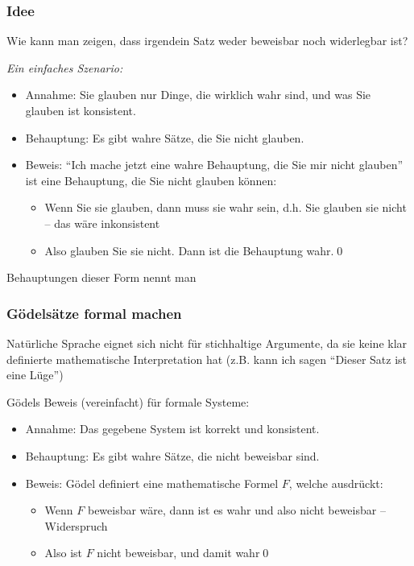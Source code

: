 \documentclass[aspectratio=1610,onlymath]{beamer}
\begin{document}
\begin{frame}\frametitle{Idee}

Wie kann man zeigen, dass irgendein Satz weder beweisbar noch widerlegbar ist?
\bigskip\pause

\emph{Ein einfaches Szenario:}
\begin{itemize}
\item \alert{Annahme:} Sie glauben nur Dinge, die wirklich wahr sind, und was Sie glauben ist konsistent.\pause
\item \alert{Behauptung:} Es gibt wahre Sätze, die Sie nicht glauben.\pause
\item \alert{Beweis:}\pause{} "`Ich mache jetzt eine wahre Behauptung, die Sie mir nicht glauben"'\pause{} ist eine Behauptung, die Sie nicht glauben können:
\begin{itemize}
\item Wenn Sie sie glauben, dann muss sie wahr sein, d.h. Sie glauben sie nicht -- das wäre inkonsistent
\item Also glauben Sie sie nicht. Dann ist die Behauptung wahr.\qed
\end{itemize}
\end{itemize}

Behauptungen dieser Form nennt man 

\end{frame}

\begin{frame}\frametitle{Gödelsätze formal machen}

Natürliche Sprache eignet sich nicht für stichhaltige Argumente, da sie keine klar definierte mathematische Interpretation hat (z.B. kann ich sagen "`Dieser Satz ist eine Lüge"')
\bigskip\pause

Gödels Beweis (vereinfacht) für formale Systeme:
\begin{itemize}
\item \alert{Annahme:} Das gegebene System ist korrekt und konsistent.
\item \alert{Behauptung:} Es gibt wahre Sätze, die nicht beweisbar sind.
\item \alert{Beweis:} Gödel definiert eine mathematische Formel $F$, welche ausdrückt:\\[1ex]
\smallskip

\begin{itemize}
\item Wenn $F$ beweisbar wäre, dann ist es wahr und also nicht beweisbar -- Widerspruch
\item Also ist $F$ nicht beweisbar, und damit wahr\qed
\end{itemize}
\end{itemize}

\end{frame}
\end{document}
